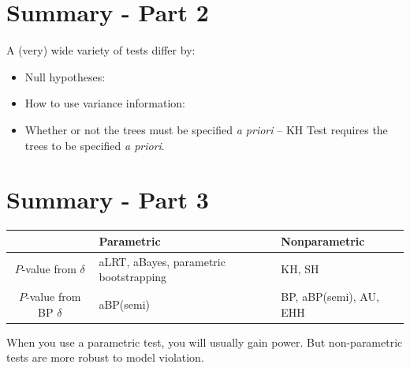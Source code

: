 \documentclass[landscape]{foils}
\begin{document}
\myNewSlide
\section*{Summary - Part 2}
\normalsize
A (very) wide variety of tests differ by:
\begin{itemize}
	\item Null hypotheses:
	\item How to use variance information:
	\item Whether or not the trees must be specified {\em a priori} -- KH Test requires the trees to be specified {\em a priori}.
\end{itemize}

\myNewSlide
\section*{Summary - Part 3}
\large
\begin{table}[htdp]
\begin{center}
\begin{tabular}{|c|p{7cm}|p{6cm}|}
\hline
& Parametric & Nonparametric \\
\hline
$P$-value from $\delta$  & aLRT, aBayes, parametric bootstrapping & KH, SH \\
\hline
$P$-value from BP $\delta$  &aBP(semi)  & BP, aBP(semi), AU, EHH\\
\hline
\end{tabular}
\end{center}
\label{default}
\end{table}%

When you use a parametric test, you will usually gain power. But non-parametric tests are more robust to model violation.
\end{document}
